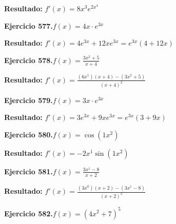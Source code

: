 \documentclass[10pt,a4paper]{article}
\begin{document}
\begin{solbox}
\textbf{Resultado:} \(\displaystyle f'(x) = 8x^{3}e^{2x^{4}}\)
\end{solbox}

\newpage
\begin{ejbox}
\textbf{Ejercicio 577.}\quad $f(x) = 4x \cdot e^{3x}$
\end{ejbox}

\begin{solbox}
\textbf{Resultado:} \(\displaystyle f'(x) = 4e^{3x} + 12xe^{3x} = e^{3x}(4 + 12x)\)
\end{solbox}

\begin{ejbox}
\textbf{Ejercicio 578.}\quad $f(x) = \frac{3x^{2} +5}{x + 4}$
\end{ejbox}

\begin{solbox}
\textbf{Resultado:} \(\displaystyle f'(x) = \frac{(6x^{1})(x+4) - (3x^{2} +5)}{(x+4)^2}\)
\end{solbox}

\begin{ejbox}
\textbf{Ejercicio 579.}\quad $f(x) = 3x \cdot e^{3x}$
\end{ejbox}

\begin{solbox}
\textbf{Resultado:} \(\displaystyle f'(x) = 3e^{3x} + 9xe^{3x} = e^{3x}(3 + 9x)\)
\end{solbox}

\newpage
\begin{ejbox}
\textbf{Ejercicio 580.}\quad $f(x) = \cos(1x^{2})$
\end{ejbox}

\begin{solbox}
\textbf{Resultado:} \(\displaystyle f'(x) = -2x^{1}\sin(1x^{2})\)
\end{solbox}

\begin{ejbox}
\textbf{Ejercicio 581.}\quad $f(x) = \frac{3x^{1} -8}{x + 2}$
\end{ejbox}

\begin{solbox}
\textbf{Resultado:} \(\displaystyle f'(x) = \frac{(3x^{0})(x+2) - (3x^{1} -8)}{(x+2)^2}\)
\end{solbox}

\begin{ejbox}
\textbf{Ejercicio 582.}\quad $f(x) = (4x^{2} +7)^{5}$
\end{ejbox}
\end{document}
